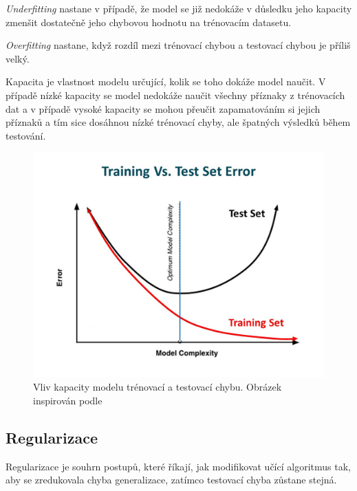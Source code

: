 \textit{Underfitting} nastane v případě, že model se již nedokáže v důsledku jeho kapacity zmenšit dostatečně jeho chybovou hodnotu na trénovacím datasetu.

\textit{Overfitting} nastane, když rozdíl mezi trénovací chybou a testovací chybou je příliš velký.

Kapacita je vlastnost modelu určující, kolik se toho dokáže model naučit. V případě nízké kapacity se model nedokáže naučit všechny příznaky z trénovacích dat a v případě vysoké kapacity se mohou přeučit zapamatováním si jejich příznaků a tím sice dosáhnou nízké trénovací chyby, ale špatných výsledků během testování\cite[p107]{mitdeeplearning}.
\begin{figure}[H]
    \centering
    \includegraphics[scale=0.3]{obrazky-figures/capacity_vs_error.jpg}
    \caption{\label{fig:gradientdescent}Vliv kapacity modelu trénovací a testovací chybu. Obrázek inspirován podle \cite{trainingvstesterror}}
\end{figure}


\subsection{Regularizace}
Regularizace je souhrn postupů, které říkají, jak modifikovat učící algoritmus tak, aby se zredukovala chyba generalizace, zatímco testovací chyba zůstane stejná\cite[p117]{mitdeeplearning}.


